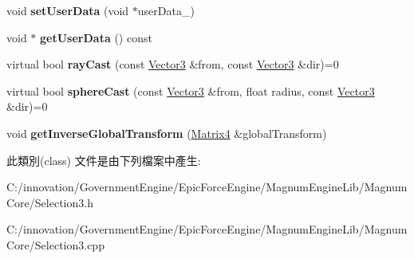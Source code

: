 \begin{DoxyCompactItemize}
\item 
void {\bfseries set\+User\+Data} (void $\ast$user\+Data\+\_\+)\hypertarget{class_i_dream_sky_1_1_selection3_1_1_bound_a42d49328676a3c194e0211ea62e4a164}{}\label{class_i_dream_sky_1_1_selection3_1_1_bound_a42d49328676a3c194e0211ea62e4a164}

\item 
void $\ast$ {\bfseries get\+User\+Data} () const \hypertarget{class_i_dream_sky_1_1_selection3_1_1_bound_afe4bfda8ac45ced59f1bffa36ec43147}{}\label{class_i_dream_sky_1_1_selection3_1_1_bound_afe4bfda8ac45ced59f1bffa36ec43147}

\item 
virtual bool {\bfseries ray\+Cast} (const \hyperlink{class_i_dream_sky_1_1_vector3}{Vector3} \&from, const \hyperlink{class_i_dream_sky_1_1_vector3}{Vector3} \&dir)=0\hypertarget{class_i_dream_sky_1_1_selection3_1_1_bound_af3787536c8cb55747e953161c94700e3}{}\label{class_i_dream_sky_1_1_selection3_1_1_bound_af3787536c8cb55747e953161c94700e3}

\item 
virtual bool {\bfseries sphere\+Cast} (const \hyperlink{class_i_dream_sky_1_1_vector3}{Vector3} \&from, float radius, const \hyperlink{class_i_dream_sky_1_1_vector3}{Vector3} \&dir)=0\hypertarget{class_i_dream_sky_1_1_selection3_1_1_bound_abb48f1d9c6bc314b6328a2f61303caf9}{}\label{class_i_dream_sky_1_1_selection3_1_1_bound_abb48f1d9c6bc314b6328a2f61303caf9}

\item 
void {\bfseries get\+Inverse\+Global\+Transform} (\hyperlink{class_i_dream_sky_1_1_matrix4}{Matrix4} \&global\+Transform)\hypertarget{class_i_dream_sky_1_1_selection3_1_1_bound_ad08bf1c98a8ba6ddf713b1fd87df3f1a}{}\label{class_i_dream_sky_1_1_selection3_1_1_bound_ad08bf1c98a8ba6ddf713b1fd87df3f1a}

\end{DoxyCompactItemize}


此類別(class) 文件是由下列檔案中產生\+:\begin{DoxyCompactItemize}
\item 
C\+:/innovation/\+Government\+Engine/\+Epic\+Force\+Engine/\+Magnum\+Engine\+Lib/\+Magnum\+Core/Selection3.\+h\item 
C\+:/innovation/\+Government\+Engine/\+Epic\+Force\+Engine/\+Magnum\+Engine\+Lib/\+Magnum\+Core/Selection3.\+cpp\end{DoxyCompactItemize}
